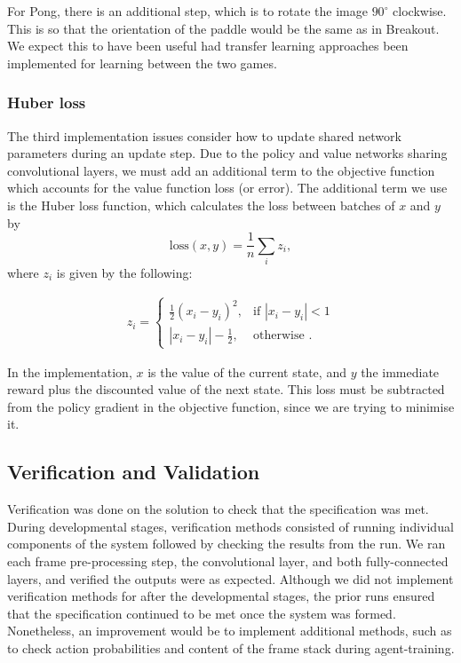 \documentclass[12pt,a4paper]{article}
\begin{document}
For Pong, there is an additional step, which is to rotate the image $90^{\circ}$ clockwise. This is so that the orientation of the paddle would be the same as in Breakout. We expect this to have been useful had transfer learning approaches been implemented for learning between the two games.

\subsubsection{Huber loss}
The third implementation issues consider how to update shared network parameters during an update step. Due to the policy and value networks sharing convolutional layers, we must add an additional term to the objective function which accounts for the value function loss (or error). The additional term we use is the Huber loss function, which calculates the loss between batches of $x$ and $y$ by $$\text{loss}(x, y) = \frac{1}{n} \sum_{i} z_{i},$$ where $z_i$ is given by the following:

\[\begin{aligned}
z_{i} =
\begin{cases}
\frac{1}{2} (x_i - y_i)^2, & \text{if } |x_i - y_i| < 1 \\
|x_i - y_i| - \frac{1}{2}, & \text{otherwise }.
\end{cases}
\end{aligned}\]

In the implementation, $x$ is the value of the current state, and $y$ the immediate reward plus the discounted value of the next state. This loss must be subtracted from the policy gradient in the objective function, since we are trying to minimise it.

\subsection{Verification and Validation}
Verification was done on the solution to check that the specification was met. During developmental stages, verification methods consisted of running individual components of the system followed by checking the results from the run. We ran each frame pre-processing step, the convolutional layer, and both fully-connected layers, and verified the outputs were as expected. Although we did not implement verification methods for after the developmental stages, the prior runs ensured that the specification continued to be met once the system was formed. Nonetheless, an improvement would be to implement additional methods, such as to check action probabilities and content of the frame stack during agent-training.
\end{document}
